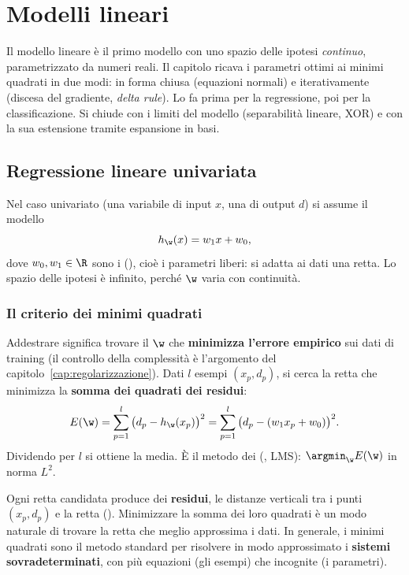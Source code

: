 \chapter{Modelli lineari}
\label{cap:lineari}

\begin{inbreve}
Il modello lineare è il primo modello con uno spazio delle ipotesi \emph{continuo}, parametrizzato da numeri
reali. Il capitolo ricava i parametri ottimi ai minimi quadrati in due modi: in forma chiusa (equazioni normali)
e iterativamente (discesa del gradiente, \emph{delta rule}). Lo fa prima per la regressione, poi per la
classificazione. Si chiude con i limiti del modello (separabilità lineare, XOR) e con la sua estensione tramite
espansione in basi.
\end{inbreve}

\section{Regressione lineare univariata}
\label{sec:lms-univariata}

Nel caso univariato (una variabile di input $x$, una di output $d$) si assume il modello
\[
h_\w(x) = w_1x + w_0 ,
\]
dove $w_0,w_1\in\R$ sono i  (), cioè i parametri liberi: si adatta ai dati una
retta. Lo spazio delle ipotesi è infinito, perché $\w$ varia con continuità.

\subsection{Il criterio dei minimi quadrati}

Addestrare significa trovare il $\w$ che \textbf{minimizza l'errore empirico} sui dati di training (il controllo
della complessità è l'argomento del capitolo~\ref{cap:regolarizzazione}). Dati $l$ esempi $(x_p,d_p)$, si cerca
la retta che minimizza la \textbf{somma dei quadrati dei residui}:
\begin{equation}\label{eq:lms-univariata}
E(\w) = \sum_{p=1}^{l}\big(d_p - h_\w(x_p)\big)^2 = \sum_{p=1}^{l}\big(d_p - (w_1x_p+w_0)\big)^2 .
\end{equation}
Dividendo per $l$ si ottiene la media. È il metodo dei  (,
LMS): $\argmin_\w E(\w)$ in norma $L^2$.

\begin{idea}
Ogni retta candidata produce dei \textbf{residui}, le distanze verticali tra i punti $(x_p,d_p)$ e la retta
(). Minimizzare la somma dei loro quadrati è un modo naturale di trovare la retta che meglio
approssima i dati. In generale, i minimi quadrati sono il metodo standard per risolvere in modo approssimato i
\textbf{sistemi sovradeterminati}, con più equazioni (gli esempi) che incognite (i parametri).
\end{idea}

